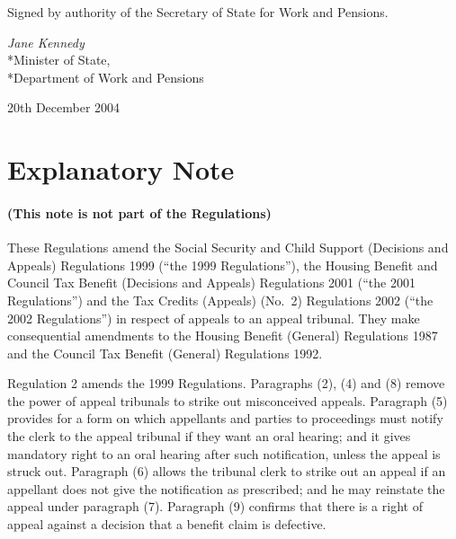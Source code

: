 \documentclass[12pt,a4paper]{article}
\begin{document}
%
%
%
%

\bigskip

Signed 
by authority of the Secretary of State for Work and Pensions.

{\raggedleft
\emph{Jane Kennedy}\\*Minister of State,\\*Department of Work and Pensions

}


20th December 2004

\small

\part{Explanatory Note}

\renewcommand\parthead{— Explanatory Note}

\subsection*{(This note is not part of the Regulations)}

These Regulations amend the Social Security and Child Support (Decisions and Appeals) Regulations 1999 (“the 1999 Regulations”), the Housing Benefit and Council Tax Benefit (Decisions and Appeals) Regulations 2001 (“the 2001 Regulations”) and the Tax Credits (Appeals) (No.\ 2) Regulations 2002 (“the 2002 Regulations”) in respect of appeals to an appeal tribunal. They make consequential amendments to the Housing Benefit (General) Regulations 1987 and the Council Tax Benefit (General) Regulations 1992.

Regulation 2 amends the 1999 Regulations. Paragraphs (2), (4) and (8) remove the power of appeal tribunals to strike out misconceived appeals. Paragraph (5) provides for a form on which appellants and parties to proceedings must notify the clerk to the appeal tribunal if they want an oral hearing; and it gives mandatory right to an oral hearing after such notification, unless the appeal is struck out. Paragraph (6) allows the tribunal clerk to strike out an appeal if an appellant does not give the notification as prescribed; and he may reinstate the appeal under paragraph (7). Paragraph (9) confirms that there is a right of appeal against a decision that a benefit claim is defective.
\end{document}
